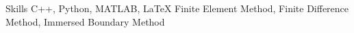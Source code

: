 
\begin{rubric}{Skills}
    C++, Python, MATLAB, \LaTeX
\entry*[Numerical]
    Finite Element Method, 
	Finite Difference Method, 
	Immersed Boundary Method
\end{rubric}
